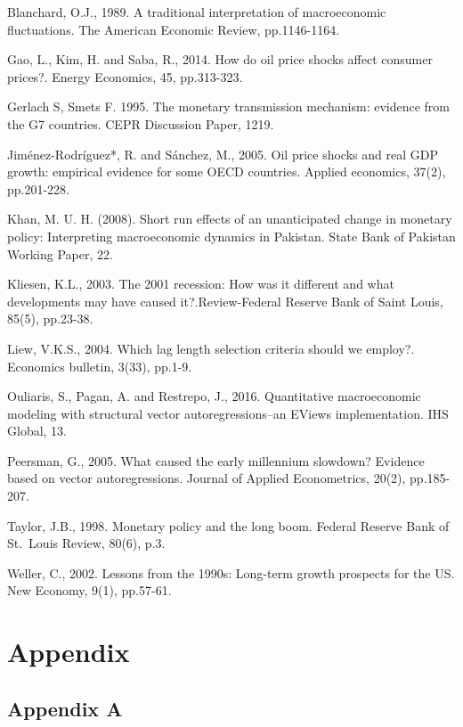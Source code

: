 \documentclass[11pt,preprint, authoryear]{elsarticle}
\numberwithin{equation}{section}
\numberwithin{figure}{section}
\numberwithin{table}{section}
\begin{document}
Blanchard, O.J., 1989. A traditional interpretation of macroeconomic
fluctuations. The American Economic Review, pp.1146-1164.

Gao, L., Kim, H. and Saba, R., 2014. How do oil price shocks affect
consumer prices?. Energy Economics, 45, pp.313-323.

Gerlach S, Smets F. 1995. The monetary transmission mechanism: evidence
from the G7 countries. CEPR Discussion Paper, 1219.

Jiménez-Rodríguez*, R. and Sánchez, M., 2005. Oil price shocks and real
GDP growth: empirical evidence for some OECD countries. Applied
economics, 37(2), pp.201-228.

Khan, M. U. H. (2008). Short run effects of an unanticipated change in
monetary policy: Interpreting macroeconomic dynamics in Pakistan. State
Bank of Pakistan Working Paper, 22.

Kliesen, K.L., 2003. The 2001 recession: How was it different and what
developments may have caused it?.Review-Federal Reserve Bank of Saint
Louis, 85(5), pp.23-38.

Liew, V.K.S., 2004. Which lag length selection criteria should we
employ?. Economics bulletin, 3(33), pp.1-9.

Ouliaris, S., Pagan, A. and Restrepo, J., 2016. Quantitative
macroeconomic modeling with structural vector autoregressions--an EViews
implementation. IHS Global, 13.

Peersman, G., 2005. What caused the early millennium slowdown? Evidence
based on vector autoregressions. Journal of Applied Econometrics, 20(2),
pp.185-207.

Taylor, J.B., 1998. Monetary policy and the long boom. Federal Reserve
Bank of St.~Louis Review, 80(6), p.3.

Weller, C., 2002. Lessons from the 1990s: Long‐term growth prospects for
the US. New Economy, 9(1), pp.57-61.

\hypertarget{appendix}{%
\section*{Appendix}\label{appendix}}

\hypertarget{appendix-a}{%
\subsection*{Appendix A}\label{appendix-a}}
\end{document}
